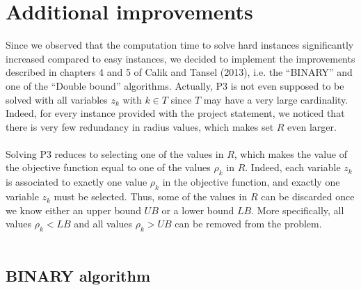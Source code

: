 \newpage
\chapter{Additional improvements}

Since we observed that the computation time to solve hard instances significantly increased compared to easy instances, we decided to implement the improvements described in chapters 4 and 5 of Calik and Tansel (2013), i.e. the ``BINARY'' and one of the ``Double bound'' algorithms.
Actually, P3 is not even supposed to be solved with all variables $z_k$ with $k \in T$ since $T$ may have a very large cardinality.
Indeed, for every instance provided with the project statement, we noticed that there is very few redundancy in radius values, which makes set $R$ even larger.\\\\
Solving P3 reduces to selecting one of the values in $R$, which makes the value of the objective function equal to one of the values $\rho_k$ in $R$.
Indeed, each variable $z_k$ is associated to exactly one value $\rho_k$ in the objective function,
and exactly one variable $z_k$ must be selected. Thus, some of the values in $R$ can be discarded once we know either an upper bound $UB$ or a lower bound $LB$.
More specifically, all values $\rho_k < LB$ and all values $\rho_k > UB$ can be removed from the problem.\\\\

\section{BINARY algorithm}

